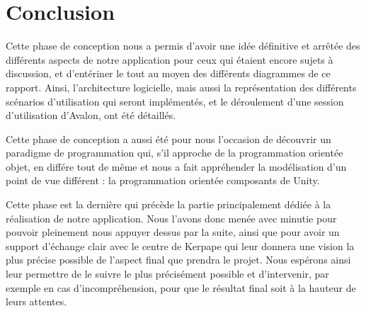 \section{Conclusion}

Cette phase de conception nous a permis d'avoir une idée définitive et arrêtée des différents aspects de notre application pour ceux qui étaient encore sujets à discussion, et d'entériner le tout au moyen des différents diagrammes de ce rapport. Ainsi, l'architecture logicielle, mais aussi la représentation des différents scénarios d'utilisation qui seront implémentés, et le déroulement d'une session d'utilisation d'Avalon, ont été détaillés.

Cette phase de conception a aussi été pour nous l'occasion de découvrir un paradigme de programmation qui, s'il approche de la programmation orientée objet, en différe tout de même et nous a fait appréhender la modélisation d'un point de vue différent : la programmation orientée composants de Unity.

Cette phase est la dernière qui précède la partie principalement dédiée à la réalisation de notre application. Nous l'avons donc menée avec minutie pour pouvoir pleinement nous appuyer dessus par la suite, ainsi que pour avoir un support d'échange clair avec le centre de Kerpape qui leur donnera une vision la plus précise possible de l'aspect final que prendra le projet. Nous espérons ainsi leur permettre de le suivre le plus précisément possible et d'intervenir, par exemple en cas d'incompréhension, pour que le résultat final soit à la hauteur de leurs attentes.